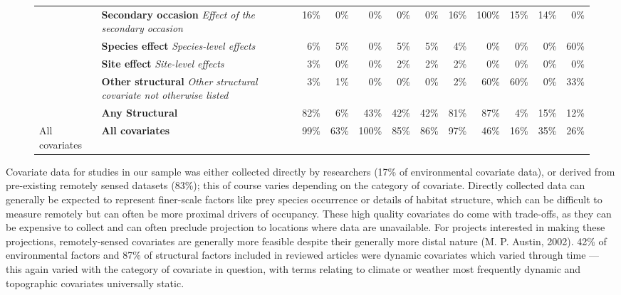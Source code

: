 \documentclass[
]{article}
\begin{document}
\begin{figure}
\begin{longtable}[]{@{}llrrrrrrrrrr@{}}
& \textbf{Secondary occasion} \emph{Effect of the secondary occasion} &
16\% & 0\% & 0\% & 0\% & 0\% & 16\% & 100\% & 15\% & 14\% & 0\% \\
& \textbf{Species effect} \emph{Species-level effects} & 6\% & 5\% & 0\%
& 5\% & 5\% & 4\% & 0\% & 0\% & 0\% & 60\% \\
& \textbf{Site effect} \emph{Site-level effects} & 3\% & 0\% & 0\% & 2\%
& 2\% & 2\% & 0\% & 0\% & 0\% & 0\% \\
& \textbf{Other structural} \emph{Other structural covariate not
otherwise listed} & 3\% & 1\% & 0\% & 0\% & 0\% & 2\% & 60\% & 60\% &
0\% & 33\% \\
& \textbf{Any Structural} & 82\% & 6\% & 43\% & 42\% & 42\% & 81\% &
87\% & 4\% & 15\% & 12\% \\
All covariates & \textbf{All covariates} & 99\% & 63\% & 100\% & 85\% &
86\% & 97\% & 46\% & 16\% & 35\% & 26\% \\

\end{longtable}

\end{figure}%

Covariate data for studies in our sample was either collected directly
by researchers (17\% of environmental covariate data), or derived from
pre-existing remotely sensed datasets (83\%); this of course varies
depending on the category of covariate. Directly collected data can
generally be expected to represent finer-scale factors like prey species
occurrence or details of habitat structure, which can be difficult to
measure remotely but can often be more proximal drivers of occupancy.
These high quality covariates do come with trade-offs, as they can be
expensive to collect and can often preclude projection to locations
where data are unavailable. For projects interested in making these
projections, remotely-sensed covariates are generally more feasible
despite their generally more distal nature (M. P. Austin, 2002). 42\% of
environmental factors and 87\% of structural factors included in
reviewed articles were dynamic covariates which varied through time ---
this again varied with the category of covariate in question, with terms
relating to climate or weather most frequently dynamic and topographic
covariates universally static.
\end{document}
